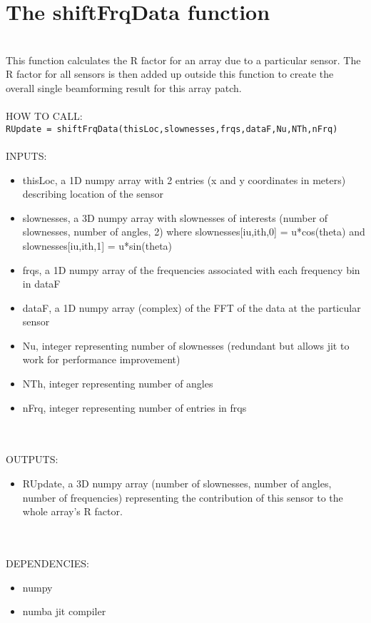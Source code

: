 \documentclass{article}
\begin{document}
\section{The shiftFrqData function}
\\
This function calculates the R factor for an array due to a particular sensor. The R factor for all sensors is then added up outside this function to create the overall single beamforming result for this array patch.
\\
\\
HOW TO CALL:
\\
\texttt{RUpdate = shiftFrqData(thisLoc,slownesses,frqs,dataF,Nu,NTh,nFrq)}
\\
\\
INPUTS:
\begin{itemize}
	\item thisLoc, a 1D numpy array with 2 entries (x and y coordinates in meters) describing location of the sensor
	\item slownesses, a 3D numpy array with slownesses of interests (number of slownesses, number of angles, 2)	where slownesses[iu,ith,0] = u*cos(theta) and slownesses[iu,ith,1] = u*sin(theta)
	\item frqs, a 1D numpy array of the frequencies associated with each frequency bin in dataF
	\item dataF, a 1D numpy array (complex) of the FFT of the data at the particular sensor
	\item Nu, integer representing number of slownesses (redundant but allows jit to work for performance improvement)
	\item NTh, integer representing number of angles
	\item nFrq, integer representing number of entries in frqs 
\end{itemize}
\\
\\
OUTPUTS:
\begin{itemize}
    \item RUpdate, a 3D numpy array (number of slownesses, number of angles, number of frequencies)	representing the contribution of this sensor to the whole array's R factor.
\end{itemize}
\\
\\
DEPENDENCIES:
\begin{itemize}
    \item numpy
    \item numba jit compiler
\end{itemize}
\\
\\
\end{document}
